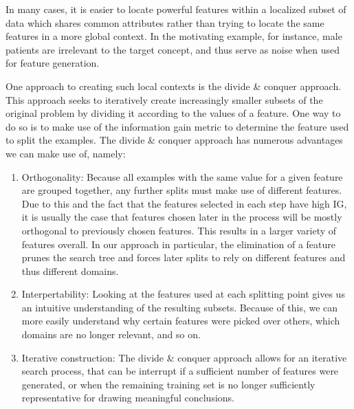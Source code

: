 \documentclass[twoside,11pt]{article}
\theoremstyle{definition}
\begin{document}
In many cases, it is easier to locate powerful features within a localized subset of data which shares common attributes rather than trying to locate the same features in a more global context. In the motivating example, for instance, male patients are irrelevant to the target concept, and thus serve as noise when used for feature generation.

One approach to creating such local contexts is the divide \& conquer approach. This approach seeks to iteratively create increasingly smaller subsets of the original problem by dividing it according to the values of a feature. One way to do so is to make use of the information gain \cite{quinlan1986} metric to determine the feature used to split the examples. The divide \& conquer approach has numerous advantages we can make use of, namely:
\begin{enumerate}
	\item Orthogonality: Because all examples with the same value for a given feature are grouped together, any further splits must make use of different features. Due to this and the fact that the features selected in each step have high IG, it is usually the case that features chosen later in the process will be mostly orthogonal to previously chosen features. This results in a larger variety of features overall. In our approach in particular, the elimination of a feature prunes the search tree and forces later splits to rely on different features and thus different domains.
	\item Interpertability: Looking at the features used at each splitting point gives us an intuitive understanding of the resulting subsets. Because of this, we can more easily understand why certain features were picked over others, which domains are no longer relevant, and so on.
	\item Iterative construction: The divide \& conquer approach allows for an iterative search process, that can be interrupt if a sufficient number of features were generated, or when the remaining training set is no longer sufficiently representative for drawing meaningful conclusions.
\end{enumerate}
\end{document}
